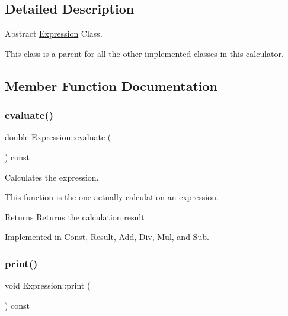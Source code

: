 \subsection{Detailed Description}
Abstract \hyperlink{class_expression}{Expression} Class. 

This class is a parent for all the other implemented classes in this calculator. 

\subsection{Member Function Documentation}
\mbox{\label{class_expression_a7437adfabeaeb0500d62d10c43a1f853}} 
\subsubsection{\texorpdfstring{evaluate()}{evaluate()}}
{\footnotesize\ttfamily double Expression\+::evaluate (\begin{DoxyParamCaption}{ }\end{DoxyParamCaption}) const\hspace{0.3cm}{\ttfamily [pure virtual]}}



Calculates the expression. 

This function is the one actually calculation an expression.

\begin{DoxyReturn}{Returns}
Returns the calculation result 
\end{DoxyReturn}


Implemented in \hyperlink{class_const_a2f86d9af4cbc9dda466815c66360ba16}{Const}, \hyperlink{class_result_a107a060722c095f33008ca435cb2397d}{Result}, \hyperlink{class_add_ac5b3425e7ac47b9f9a83e2f6da0d81ca}{Add}, \hyperlink{class_div_a5b96e19e7cffdb205a9e56377be3652e}{Div}, \hyperlink{class_mul_a3e98f760d06aaac61dda9ab57d174a35}{Mul}, and \hyperlink{class_sub_a15b87b081136f533a993a92ac01ec11b}{Sub}.

\mbox{\label{class_expression_a6e05f883ebf77faf344dbaebfc82b3a0}} 
\subsubsection{\texorpdfstring{print()}{print()}}
{\footnotesize\ttfamily void Expression\+::print (\begin{DoxyParamCaption}{ }\end{DoxyParamCaption}) const\hspace{0.3cm}{\ttfamily [pure virtual]}}



